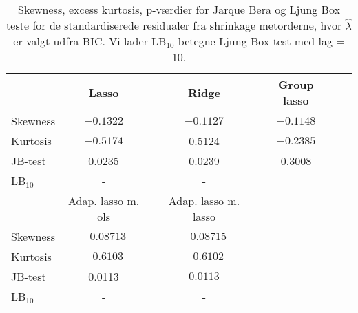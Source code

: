 \begin{table}
\center
\begin{tabular}{lrrrrrrrrrr} 
\toprule
& \multicolumn{2}{c}{Lasso} && \multicolumn{2}{c}{Ridge } && \multicolumn{2}{c}{Group lasso} \\ \midrule
Skewness & \multicolumn{2}{c}{$-0.1322$} &&\multicolumn{2}{c}{$-0.1127$} && \multicolumn{2}{c}{$-0.1148$} \\
Kurtosis & \multicolumn{2}{c}{$-0.5174$} && \multicolumn{2}{c}{0.5124} &&\multicolumn{2}{c}{$-0.2385$} \\
JB-test & \multicolumn{2}{c}{0.0235} && \multicolumn{2}{c}{0.0239} && \multicolumn{2}{c}{0.3008}  \\
LB$_{10}$ &  \multicolumn{2}{c}{-} &&  \multicolumn{2}{c}{-} &&  \multicolumn{2}{c}{} \\  \bottomrule \toprule
 & \multicolumn{2}{c}{Adap. lasso m. ols}  && \multicolumn{2}{c}{Adap. lasso m. lasso} \\ \midrule
Skewness &  \multicolumn{2}{c}{$-0.08713$} && \multicolumn{2}{c}{$-0.08715$} \\
Kurtosis & \multicolumn{2}{c}{$-0.6103$} && \multicolumn{2}{c}{$-0.6102$} \\
JB-test &  \multicolumn{2}{c}{0.0113} &&  \multicolumn{2}{c}{$0.0113$} \\ 
LB$_{10}$ &   \multicolumn{2}{c}{-} &&  \multicolumn{2}{c}{-} \\ \bottomrule
 \end{tabular}
\caption{Skewness, excess kurtosis, p-værdier for Jarque Bera og Ljung Box teste for de standardiserede residualer fra shrinkage metorderne, hvor  $\widehat{\lambda}$ er valgt udfra BIC. Vi lader LB$_{10}$ betegne Ljung-Box test med lag = 10. } \label{tab:res_shrinkage_bic_tab}
\end{table}